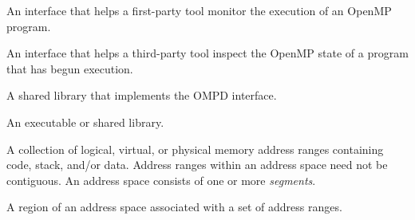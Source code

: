 {\color{blue}

\glossarydefstart
An interface that helps a first-party tool monitor the execution of an OpenMP program.
\glossarydefend
	
\glossarydefstart
An interface that helps a third-party tool inspect the OpenMP state of a program that has begun execution.
\glossarydefend

\glossarydefstart
A shared library that implements the OMPD interface.
\glossarydefend

\glossarydefstart
An executable or shared library.
\glossarydefend


\glossarydefstart
A collection of logical, virtual, or physical memory address ranges containing code, stack, and/or data. 
Address ranges within an address space need not be contiguous.  An address space consists of one or more \emph{segments}.
\glossarydefend

\glossarydefstart
A region of an address space associated with a set of address ranges.
\glossarydefend

\begin{comment}
}
{\color{red}

\glossaryterm{architecture}
\glossarydefstart
A combination of the processor and the Application Binary Interface (ABI) used by 
threads and address spaces. 
\glossarydefend


\end{comment}}
